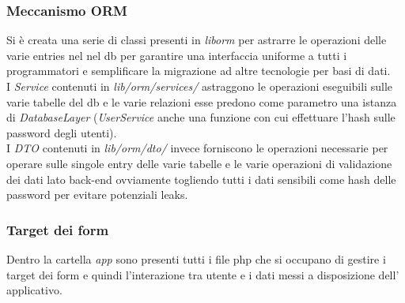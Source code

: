 \subsubsection{Meccanismo ORM}
Si è creata una serie di classi presenti in \textit{lib\slshape orm\slshape}
per astrarre le operazioni delle varie entries nel nel db per garantire una
interfaccia uniforme a tutti i programmatori e semplificare la migrazione ad
altre tecnologie per basi di dati.\\

I \textit{Service} contenuti in \textit{lib/orm/services/}
astraggono le operazioni eseguibili sulle varie tabelle del db e le varie
relazioni esse predono come parametro una istanza di \textit{DatabaseLayer}
(\textit{UserService} anche una funzione con cui effettuare l'hash sulle
password degli utenti).\\

I \textit{DTO} contenuti in \textit{lib/orm/dto/} invece forniscono le
operazioni necessarie per operare sulle singole entry delle varie tabelle e
le varie operazioni di validazione dei dati lato back-end ovviamente
togliendo tutti i dati sensibili come hash delle password per evitare
potenziali leaks.

\subsubsection{Target dei form}
Dentro la cartella \textit{app} sono presenti tutti i file php che si occupano
di gestire i target dei form e quindi l'interazione tra utente e i dati messi
a disposizione dell' applicativo.
